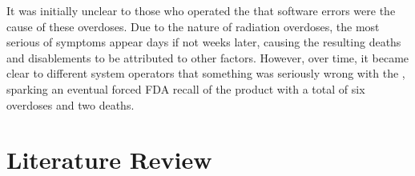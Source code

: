 \documentclass{cshonours}
\begin{document}
It was initially unclear to those who operated the \ther that software errors were the cause of these overdoses. Due to the nature of radiation overdoses, the most serious of symptoms appear days if not weeks later, causing the resulting deaths and disablements to be attributed to other factors. However, over time, it became clear to different system operators that something was seriously wrong with the \ther, sparking an eventual forced FDA recall of the product with a total of six overdoses and two deaths.

\chapter{Literature Review}

\appendix


\end{document}
